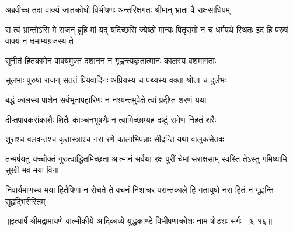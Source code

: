 \twolineshloka
{अब्रवीच्च तदा वाक्यं जातक्रोधो विभीषणः}
{अन्तरिक्षगतः श्रीमान् भ्राता वै राक्षसाधिपम्} %

\threelineshloka
{स त्वं भ्रान्तोऽसि मे राजन् ब्रूहि मां यद् यदिच्छसि}
{ज्येष्ठो मान्यः पितृसमो न च धर्मपथे स्थितः}
{इदं हि परुषं वाक्यं न क्षमाम्यग्रजस्य ते} %

\twolineshloka
{सुनीतं हितकामेन वाक्यमुक्तं दशानन}
{न गृह्णन्त्यकृतात्मानः कालस्य वशमागताः} %

\twolineshloka
{सुलभाः पुरुषा राजन् सततं प्रियवादिनः}
{अप्रियस्य च पथ्यस्य वक्ता श्रोता च दुर्लभः} %

\twolineshloka
{बद्धं कालस्य पाशेन सर्वभूतापहारिणः}
{न नश्यन्तमुपेक्षे त्वां प्रदीप्तं शरणं यथा} %

\twolineshloka
{दीप्तपावकसंकाशैः शितैः काञ्चनभूषणैः}
{न त्वामिच्छाम्यहं द्रष्टुं रामेण निहतं शरैः} %

\twolineshloka
{शूराश्च बलवन्तश्च कृतास्त्राश्च नरा रणे}
{कालाभिपन्नाः सीदन्ति यथा वालुकसेतवः} %

\threelineshloka
{तन्मर्षयतु यच्चोक्तं गुरुत्वाद्धितमिच्छता}
{आत्मानं सर्वथा रक्ष पुरीं चेमां सराक्षसाम्}
{स्वस्ति तेऽस्तु गमिष्यामि सुखी भव मया विना} %

\twolineshloka
{निवार्यमाणस्य मया हितैषिणा न रोचते ते वचनं निशाचर}
{परान्तकाले हि गतायुषो नरा हितं न गृह्णन्ति सुहृद्भिरीरितम्} %


॥इत्यार्षे श्रीमद्रामायणे वाल्मीकीये आदिकाव्ये युद्धकाण्डे विभीषणाक्रोशः नाम षोडशः सर्गः ॥६-१६॥
